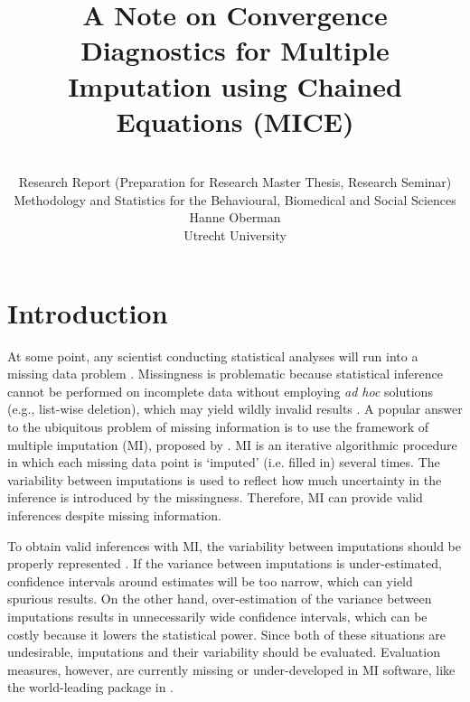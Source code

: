 \documentclass[article]{jss}
\author{\\Research Report (Preparation for Research Master Thesis, Research Seminar) \\ Methodology and Statistics for the Behavioural, Biomedical and Social Sciences \AND Hanne Oberman\\Utrecht University}
\title{A Note on Convergence Diagnostics for Multiple Imputation using Chained Equations (MICE)}
\begin{document}

\section{Introduction} \label{sec:intro} %

At some point, any scientist conducting statistical analyses will run into a missing data problem \citep{alli02}. Missingness is problematic because statistical inference cannot be performed on incomplete data without employing \emph{ad hoc} solutions (e.g., list-wise deletion), which may yield wildly invalid results \citep{buur18}. A popular answer to the ubiquitous problem of missing information is to use the framework of multiple imputation (MI), proposed by \cite{rubin87}. MI is an iterative algorithmic procedure in which each missing data point is `imputed' (i.e. filled in) several times. The variability between imputations is used to reflect how much uncertainty in the inference is introduced by the missingness. Therefore, MI can provide valid inferences despite missing information. 

To obtain valid inferences with MI, the variability between imputations should be properly represented \citep{rubin87, buur18}. If the variance between imputations is under-estimated, confidence intervals around estimates will be too narrow, which can yield spurious results. On the other hand, over-estimation of the variance between imputations results in unnecessarily wide confidence intervals, which can be costly because it lowers the statistical power. Since both of these situations are undesirable, imputations and their variability should be evaluated. Evaluation measures, however, are currently missing or under-developed in MI software, like the world-leading  package \citep{mice} in  \citep{R}. %
\end{document}

